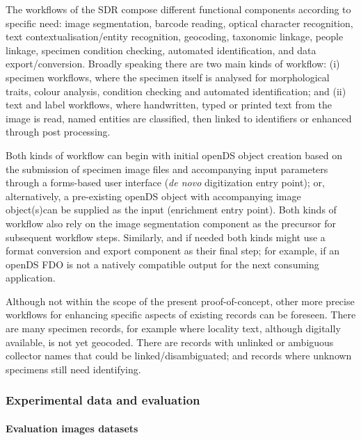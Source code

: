 The workflows of the SDR compose different functional components
according to specific need: image segmentation, barcode reading, optical
character recognition, text contextualisation/entity recognition,
geocoding, taxonomic linkage, people linkage, specimen condition
checking, automated identification, and data export/conversion. Broadly
speaking there are two main kinds of workflow: (i) specimen workflows,
where the specimen itself is analysed for morphological traits, colour
analysis, condition checking and automated identification; and (ii) text
and label workflows, where handwritten, typed or printed text from the
image is read, named entities are classified, then linked to identifiers
or enhanced through post processing.

Both kinds of workflow can begin with initial openDS object creation
based on the submission of specimen image files and accompanying input
parameters through a forms-based user interface (\emph{de novo}
digitization entry point); or, alternatively, a pre-existing openDS
object with accompanying image object(s)can be supplied as the input
(enrichment entry point). Both kinds of workflow also rely on the image
segmentation component as the precursor for subsequent workflow steps.
Similarly, and if needed both kinds might use a format conversion and
export component as their final step; for example, if an openDS FDO is
not a natively compatible output for the next consuming application.

Although not within the scope of the present proof-of-concept, other
more precise workflows for enhancing specific aspects of existing
records can be foreseen. There are many specimen records, for example
where locality text, although digitally available, is not yet geocoded.
There are records with unlinked or ambiguous collector names that could
be linked/disambiguated; and records where unknown specimens still need
identifying.

\subsubsection{Experimental data and evaluation}\label{experimental-data-and-evaluation}

\paragraph{Evaluation images datasets}\label{evaluation-images-datasets}

